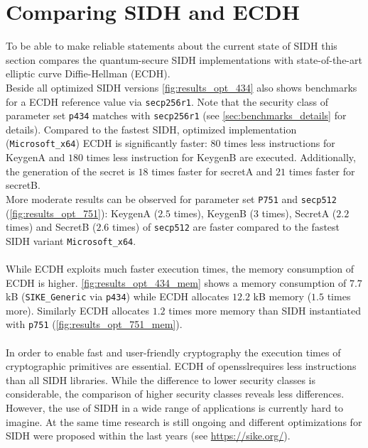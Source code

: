 \section{Comparing \gls{SIDH} and \gls{ECDH}} \label{sec:analysis_effiency_ecdh}

To be able to make reliable statements about the current state of \gls{SIDH} this section compares the quantum-secure \gls{SIDH} implementations with state-of-the-art elliptic curve Diffie-Hellman (\gls{ECDH}). \\
Beside all optimized \gls{SIDH} versions \autoref{fig:results_opt_434} also shows benchmarks for a \gls{ECDH} reference value via \texttt{secp256r1}. Note that the security class of parameter set \texttt{p434} matches with \texttt{secp256r1} (see \autoref{sec:benchmarks_details} for details). Compared to the fastest \gls{SIDH}, optimized implementation (\texttt{Microsoft\_x64}) \gls{ECDH} is significantly faster: $80$ times less instructions for KeygenA and $180$ times less instruction for KeygenB are executed. Additionally, the generation of the secret is $18$ times faster for secretA and $21$ times faster for secretB.\\
More moderate results can be observed for parameter set \texttt{P751} and \texttt{secp512} (\autoref{fig:results_opt_751}): KeygenA ($2.5$ times),  KeygenB ($3$ times), SecretA ($2.2$ times) and SecretB ($2.6$ times) of \texttt{secp512} are faster compared to the fastest \gls{SIDH} variant \texttt{Microsoft\_x64}.
\\\\
While \gls{ECDH} exploits much faster execution times, the memory consumption of \gls{ECDH} is higher.  \autoref{fig:results_opt_434_mem} shows a memory consumption of $7.7$ \gls{kB} (\texttt{SIKE\_Generic} via \texttt{p434}) while \gls{ECDH} allocates $12.2$ \gls{kB} memory ($1.5$ times more). Similarly \gls{ECDH} allocates $1.2$ times more memory than \gls{SIDH} instantiated with \texttt{p751} (\autoref{fig:results_opt_751_mem}).
\\\\
In order to enable fast and user-friendly cryptography the execution times of cryptographic primitives are essential. \gls{ECDH} of \gls{openssl}requires less instructions than all \gls{SIDH} libraries. While the difference to lower security classes is considerable, the comparison of higher security classes reveals less differences. However, the use of \gls{SIDH} in a wide range of applications is currently hard to imagine. At the same time research is still ongoing and different optimizations for \gls{SIDH} were proposed within the last years (see \url{https://sike.org/}). 
